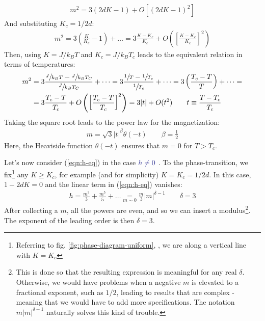 \documentclass[../../main.tex]{subfiles}
\begin{document}
\begin{align*}
    m^2 = 3(2dK-1) + O[(2dK-1)^2]
\end{align*}
And substituting $K_c = 1/2d$:
\begin{align}\label{eqn:msquareK}
    m^2 = 3\left(\frac{K}{K_c}-1 \right) + \dots = 3 \frac{K-K_c}{K_c} + O\left(\left[\frac{K-K_c}{K_c} \right]^2\right) 
\end{align}
Then, using $K=J/k_B T$ and $K_c = J/k_B T_c$ leads to the equivalent relation in terms of temperatures:
\begin{align*}
    m^2 &= 3 \frac{\sfrac{J}{k_BT} - \sfrac{J}{k_B T_C}}{\sfrac{J}{k_B T_C}} +\dots = 3 \frac{\sfrac{1}{T} - \sfrac{1}{T_c}}{\sfrac{1}{T_c}} +\dots = 3\left(\frac{T_c - T}{T} \right) + \dots =\\ %
    &= 3 \frac{T_c - T}{T_c} + O\left(\left[\frac{T_c - T}{T_c} \right]^2\right)  = 3 |t| + O(t^2) \qquad t \equiv \frac{T-T_c}{T_c} 
\end{align*} 
Taking the square root leads to the power law for the magnetization:
\begin{align}\label{eqn:m-power-law-h0}
    m = \sqrt{3} |t|^\beta \theta(-t) \qquad \beta = \frac{1}{2} 
\end{align}
Here, the Heaviside function $\theta(-t)$ ensures that $m=0$ for $T > T_c$.

\medskip

Let's now consider (\ref{eqn:h-eq}) in the case $\textcolor{Blue}{h \neq 0}$ . To  the phase-transition, we fix\footnote{Referring to fig. \ref{fig:phase-diagram-uniform}, \pageref{fig:phase-diagram-uniform}, we are  along a vertical line with $K = K_c$} any $K \geq K_c$, for example (and for simplicity) $K=K_c = 1/2d$. In this case, $1-2dK = 0$ and the linear term in (\ref{eqn:h-eq}) vanishes:
\begin{align}\label{eqn:m-power-law-h}
    h = \frac{m^3}{3} + \frac{m^5}{5} + \dots \underset{m\sim 0}{=} \frac{m}{3} |m|^{\delta - 1} \qquad \delta=3
\end{align}
After collecting a $m$, all the powers are even, and so we can insert a modulus\footnote{This is done so that the resulting expression is meaningful for any real $\delta$. Otherwise, we would have problems when a negative $m$ is elevated to a fractional exponent, such as $1/2$, leading to results that are complex - meaning that we would have to add more specifications. The notation $m|m|^{\delta-1}$ naturally solves this kind of trouble.}. The exponent of the leading order is then $\delta=3$.
\end{document}
